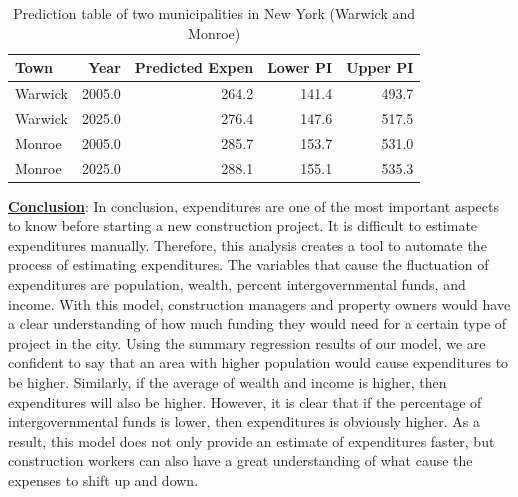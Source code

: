 \documentclass[11pt]{article}\usepackage[]{graphicx}\usepackage[]{color}
\begin{document}
\begin{center}
\begin{table}[ht]
\centering
\begin{tabular}{lrrrr}
  \hline
Town & Year & Predicted Expen & Lower PI & Upper PI \\ 
  \hline
Warwick & 2005.0 & 264.2 & 141.4 & 493.7 \\ 
  Warwick & 2025.0 & 276.4 & 147.6 & 517.5 \\ 
  Monroe & 2005.0 & 285.7 & 153.7 & 531.0 \\ 
  Monroe & 2025.0 & 288.1 & 155.1 & 535.3 \\ 
   \hline
\end{tabular}
\caption{Prediction table of two municipalities in New York (Warwick and Monroe)} 
\label{pred_tab}
\end{table}

\end{center}

\noindent\textbf{\underline{Conclusion}}: In conclusion, expenditures are one of the most important aspects to know before starting a new construction project. It is difficult to estimate expenditures manually. Therefore, this analysis creates a tool to automate the process of estimating expenditures. The variables that cause the fluctuation of expenditures are population, wealth, percent intergovernmental funds, and income. With this model, construction managers and property owners would have a clear understanding of how much funding they would need for a certain type of project in the city. Using the summary regression results of our model, we are confident to say that an area with higher population would cause expenditures to be higher. Similarly, if the average of wealth and income is higher, then expenditures will also be higher. However, it is clear that if the percentage of intergovernmental funds is lower, then expenditures is obviously higher. As a result, this model does not only provide an estimate of expenditures faster, but construction workers can also have a great understanding of what cause the expenses to shift up and down.
\hfill \break
\end{document}
